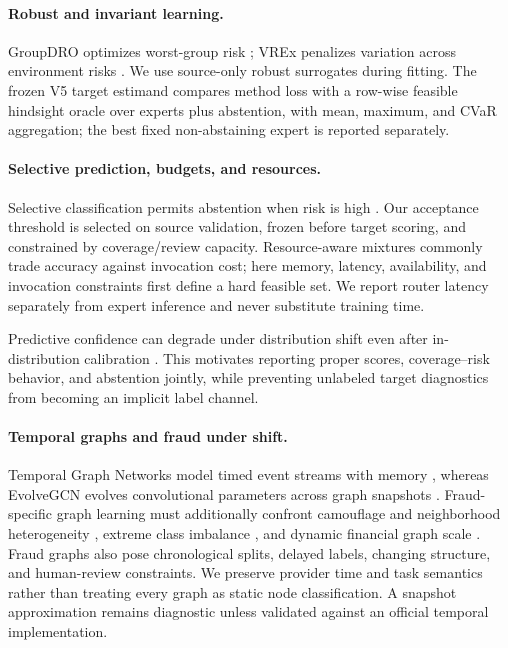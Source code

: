 \paragraph{Robust and invariant learning.}
GroupDRO optimizes worst-group risk \cite{sagawa2020groupdro}; VREx penalizes variation across environment risks \cite{krueger2021vrex}. We use source-only robust surrogates during fitting. The frozen V5 target estimand compares method loss with a row-wise feasible hindsight oracle over experts plus abstention, with mean, maximum, and CVaR aggregation; the best fixed non-abstaining expert is reported separately.

\paragraph{Selective prediction, budgets, and resources.}
Selective classification permits abstention when risk is high \cite{geifman2017selective}. Our acceptance threshold is selected on source validation, frozen before target scoring, and constrained by coverage/review capacity. Resource-aware mixtures commonly trade accuracy against invocation cost; here memory, latency, availability, and invocation constraints first define a hard feasible set. We report router latency separately from expert inference and never substitute training time.

Predictive confidence can degrade under distribution shift even after in-distribution calibration \cite{ovadia2019uncertainty}. This motivates reporting proper scores, coverage--risk behavior, and abstention jointly, while preventing unlabeled target diagnostics from becoming an implicit label channel.

\paragraph{Temporal graphs and fraud under shift.}
Temporal Graph Networks model timed event streams with memory \cite{rossi2020tgn}, whereas EvolveGCN evolves convolutional parameters across graph snapshots \cite{pareja2020evolvegcn}. Fraud-specific graph learning must additionally confront camouflage and neighborhood heterogeneity \cite{dou2020caregnn}, extreme class imbalance \cite{liu2021pcgnn}, and dynamic financial graph scale \cite{huang2022dgraph}. Fraud graphs also pose chronological splits, delayed labels, changing structure, and human-review constraints. We preserve provider time and task semantics rather than treating every graph as static node classification. A snapshot approximation remains diagnostic unless validated against an official temporal implementation.

